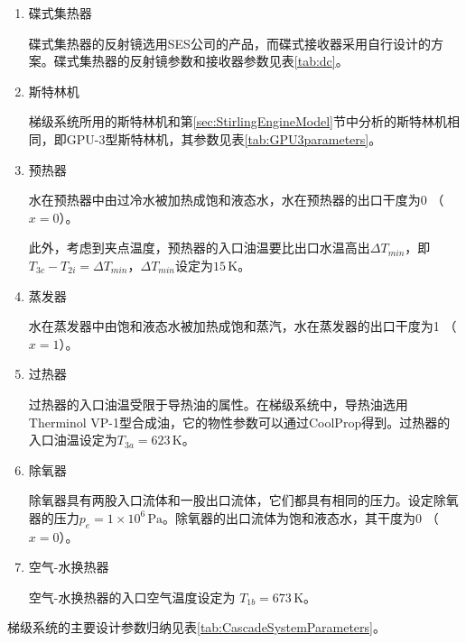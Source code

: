 \begin{enumerate}[label=(\arabic*)]
\item 碟式集热器

碟式集热器的反射镜选用SES公司的产品，而碟式接收器采用自行设计的方案。碟式集热器的反射镜参数和接收器参数见表\ref{tab:dc}。

\item 斯特林机

梯级系统所用的斯特林机和第\ref{sec:StirlingEngineModel}节中分析的斯特林机相同，即GPU-3型斯特林机，其参数见表\ref{tab:GPU3parameters}。

\item 预热器

水在预热器中由过冷水被加热成饱和液态水，水在预热器的出口干度为0 （$x = 0$）。

此外，考虑到夹点温度，预热器的入口油温要比出口水温高出$\Delta T_{min}$，即$T_{3c} - T_{2i} = \Delta T_{min}$，$\Delta T_{min}$设定为$15\,\mathrm{K}$。

\item 蒸发器

水在蒸发器中由饱和液态水被加热成饱和蒸汽，水在蒸发器的出口干度为1 （$x = 1$）。

\item 过热器

过热器的入口油温受限于导热油的属性。在梯级系统中，导热油选用Therminol VP-1型合成油，它的物性参数可以通过CoolProp得到。过热器的入口油温设定为$T_{3a} = 623\,\mathrm{K}$。

\item 除氧器

除氧器具有两股入口流体和一股出口流体，它们都具有相同的压力。设定除氧器的压力$p_e = 1\times10^6\,\mathrm{Pa}$。除氧器的出口流体为饱和液态水，其干度为0 （$x = 0$）。

\item 空气-水换热器

空气-水换热器的入口空气温度设定为 $T_{1b} = 673\,\mathrm{K}$。
\end{enumerate}

\smallskip{}
梯级系统的主要设计参数归纳见表\ref{tab:CascadeSystemParameters}。

